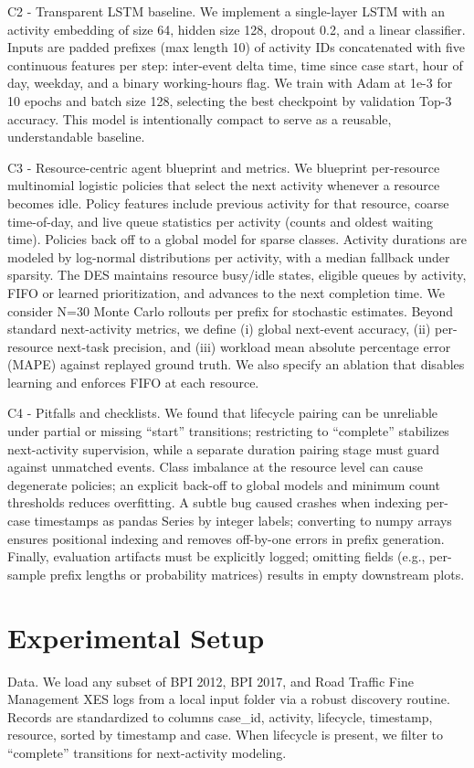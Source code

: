 \documentclass{article}
\theoremstyle{plain}
\theoremstyle{definition}
\theoremstyle{remark}
\begin{document}
	C2 - Transparent LSTM baseline. We implement a single-layer LSTM with an activity embedding of size 64, hidden size 128, dropout 0.2, and a linear classifier. Inputs are padded prefixes (max length 10) of activity IDs concatenated with five continuous features per step: inter-event delta time, time since case start, hour of day, weekday, and a binary working-hours flag. We train with Adam at 1e-3 for 10 epochs and batch size 128, selecting the best checkpoint by validation Top-3 accuracy. This model is intentionally compact to serve as a reusable, understandable baseline.
	
	C3 - Resource-centric agent blueprint and metrics. We blueprint per-resource multinomial logistic policies that select the next activity whenever a resource becomes idle. Policy features include previous activity for that resource, coarse time-of-day, and live queue statistics per activity (counts and oldest waiting time). Policies back off to a global model for sparse classes. Activity durations are modeled by log-normal distributions per activity, with a median fallback under sparsity. The DES maintains resource busy/idle states, eligible queues by activity, FIFO or learned prioritization, and advances to the next completion time. We consider N=30 Monte Carlo rollouts per prefix for stochastic estimates. Beyond standard next-activity metrics, we define (i) global next-event accuracy, (ii) per-resource next-task precision, and (iii) workload mean absolute percentage error (MAPE) against replayed ground truth. We also specify an ablation that disables learning and enforces FIFO at each resource.
	
	C4 - Pitfalls and checklists. We found that lifecycle pairing can be unreliable under partial or missing ``start'' transitions; restricting to ``complete'' stabilizes next-activity supervision, while a separate duration pairing stage must guard against unmatched events. Class imbalance at the resource level can cause degenerate policies; an explicit back-off to global models and minimum count thresholds reduces overfitting. A subtle bug caused crashes when indexing per-case timestamps as pandas Series by integer labels; converting to numpy arrays ensures positional indexing and removes off-by-one errors in prefix generation. Finally, evaluation artifacts must be explicitly logged; omitting fields (e.g., per-sample prefix lengths or probability matrices) results in empty downstream plots.
	
	\section{Experimental Setup}
	\label{sec:experimental_setup}
	Data. We load any subset of BPI 2012, BPI 2017, and Road Traffic Fine Management XES logs from a local input folder via a robust discovery routine. Records are standardized to columns case\_id, activity, lifecycle, timestamp, resource, sorted by timestamp and case. When lifecycle is present, we filter to ``complete'' transitions for next-activity modeling.
	
\end{document}
